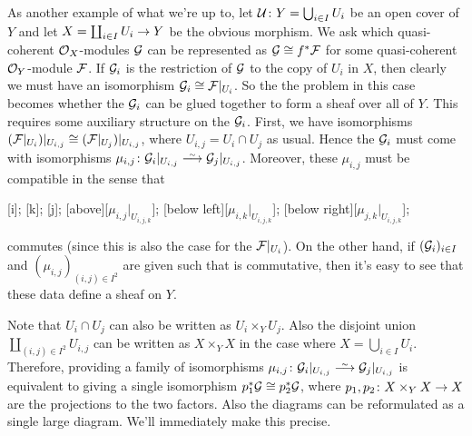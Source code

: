 \documentclass[a4paper,parskip=half,numbers=enddot, DIV=12]{scrreprt}
\begin{document}
As another example of what we're up to, let $\mathcal{U}\colon Y=\bigcup_{i\in I}U_i$ be an open cover of $Y$ and let $X=\coprod_{i\in I}U_i\morphism Y$ be the obvious morphism. We ask which quasi-coherent $\mathcal{O}_X$-modules $\mathcal{G}$ can be represented as $\mathcal{G}\cong f^*\mathcal{F}$ for some quasi-coherent $\mathcal{O}_Y$-module $\mathcal{F}$. If $\mathcal{G}_i$ is the restriction of $\mathcal{G}$ to the copy of $U_i$ in $X$, then clearly we must have an isomorphism $\mathcal{G}_i\cong \mathcal{F}|_{U_i}$. So the the problem in this case becomes whether the $\mathcal{G}_i$ can be glued together to form a sheaf over all of $Y$. This requires some auxiliary structure on the $\mathcal{G}_i$. First, we have isomorphisms $(\mathcal{F}|_{U_i})|_{U_{i,j}}\cong (\mathcal{F}|_{U_j})|_{U_{i,j}}$, where $U_{i,j}=U_i\cap U_j$ as usual. Hence the $\mathcal{G}_i$ must come with isomorphisms $\mu_{i,j}\colon \Gg_i|_{U_{i,j}}\isomorphism \Gg_j|_{U_{i,j}}$. Moreover, these $\mu_{i,j}$ must be compatible in the sense that
\begin{diagram}
	;
	;
	;
	\scriptsize
	[above][$\mu_{i,j}|_{U_{i,j,k}}$];
	[below left][$\mu_{i,k}|_{U_{i,j,k}}$];
	[below right][$\mu_{j,k}|_{U_{i,j,k}}$];
\end{diagram}
commutes (since this is also the case for the $\mathcal{F}|_{U_i}$). On the other hand, if $(\mathcal{G}_i)_{i\in I}$ and $(\mu_{i,j})_{(i,j)\in I^2}$ are given such that  is commutative, then it's easy to see that these data define a sheaf on $Y$.

 Note that $U_i\cap U_j$ can also be written as $U_i\times_YU_j$. Also the disjoint union $\coprod_{(i,j)\in I^2}U_{i,j}$ can be written as $X\times_YX$ in the case where $X=\bigcup_{i\in I}U_i$. Therefore, providing a family of isomorphisms $\mu_{i,j}\colon \Gg_i|_{U_{i,j}}\isomorphism \Gg_j|_{U_{i,j}}$ is equivalent to giving a single isomorphism $p_1^*\mathcal{G}\cong p_2^*\mathcal{G}$, where $p_1,p_2\colon X\times_YX\morphism X$ are the projections to the two factors. Also the diagrams  can be reformulated as a single large diagram. We'll immediately make this precise. 
 
\end{document}
